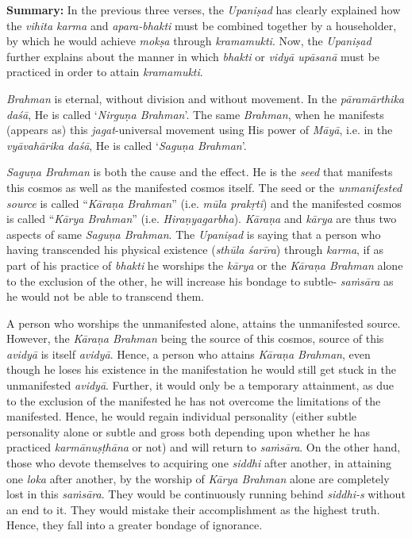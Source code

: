 \textbf{Summary:} In the previous three verses, the \emph{Upaniṣad} has clearly explained how the \emph{vihita karma} and \emph{apara-bhakti} must be combined together by a householder, by which he would achieve \emph{mokṣa} through \emph{kramamukti}. Now, the \emph{Upaniṣad} further explains about the manner in which \emph{bhakti} or \emph{vidyā upāsanā} must be practiced in order to attain \emph{kramamukti}.

\emph{Brahman} is eternal, without division and without movement. In the \emph{pāramārthika daśā}, He is called `\emph{Nirguṇa Brahman}'. The same \emph{Brahman}, when he manifests (appears as) this \emph{jagat}-universal movement using His power of \emph{Māyā}, i.e. in the \emph{vyāvahārika daśā}, He is called `\emph{Saguṇa Brahman}'.

\emph{Saguṇa Brahman} is both the cause and the effect. He is the \emph{seed} that manifests this cosmos as well as the manifested cosmos itself. The seed or the \emph{unmanifested source} is called ``\emph{Kāraṇa Brahman}'' (i.e. \emph{mūla prakṛti}) and the manifested cosmos is called ``\emph{Kārya Brahman}'' (i.e. \emph{Hiraṇyagarbha}). \emph{Kāraṇa} and \emph{kārya} are thus two aspects of same \emph{Saguṇa Brahman}. The \emph{Upaniṣad} is saying that a person who having transcended his physical existence (\emph{sthūla śarīra}) through \emph{karma}, if as part of his practice of \emph{bhakti} he worships the \emph{kārya} or the \emph{Kāraṇa Brahman} alone to the exclusion of the other, he will increase his bondage to subtle- \emph{saṁsāra} as he would not be able to transcend them.

A person who worships the unmanifested alone, attains the unmanifested source. However, the \emph{Kāraṇa Brahman} being the source of this cosmos, source of this \emph{avidyā} is itself \emph{avidyā}. Hence, a person who attains \emph{Kāraṇa Brahman}, even though he loses his existence in the manifestation he would still get stuck in the unmanifested \emph{avidyā}. Further, it would only be a temporary attainment, as due to the exclusion of the manifested he has not overcome the limitations of the manifested. Hence, he would regain individual personality (either subtle personality alone or subtle and gross both depending upon whether he has practiced \emph{karmānuṣṭhāna} or not) and will return to \emph{saṁsāra}. On the other hand, those who devote themselves to acquiring one \emph{siddhi} after another, in attaining one \emph{loka} after another, by the worship of \emph{Kārya Brahman} alone are completely lost in this \emph{saṁsāra}. They would be continuously running behind \emph{siddhi-s} without an end to it. They would mistake their accomplishment as the highest truth. Hence, they fall into a greater bondage of ignorance.

